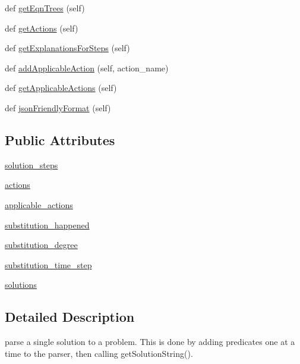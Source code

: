\begin{DoxyCompactItemize}
\item 
def \hyperlink{classeqn__viz_1_1_math_problem_parser_a105702b6ef3f51d49153c51b1a5b1a29}{get\+Eqn\+Trees} (self)
\item 
def \hyperlink{classeqn__viz_1_1_math_problem_parser_aabf2f43b2ee403d9cf0cb873bbe28db9}{get\+Actions} (self)
\item 
def \hyperlink{classeqn__viz_1_1_math_problem_parser_a247aa12b6f38592c0fbcd0ac15b5520d}{get\+Explanations\+For\+Steps} (self)
\item 
def \hyperlink{classeqn__viz_1_1_math_problem_parser_af346d451472b46a9228c07d3dd7f0de8}{add\+Applicable\+Action} (self, action\+\_\+name)
\item 
def \hyperlink{classeqn__viz_1_1_math_problem_parser_aa8aded82942f9ac196e6e109fb9a45ec}{get\+Applicable\+Actions} (self)
\item 
def \hyperlink{classeqn__viz_1_1_math_problem_parser_a6adfec45bb22a5585db6e689c27aa393}{json\+Friendly\+Format} (self)
\end{DoxyCompactItemize}
\subsection*{Public Attributes}
\begin{DoxyCompactItemize}
\item 
\hyperlink{classeqn__viz_1_1_math_problem_parser_aa35a182df8bfc89e74a840e370e089f2}{solution\+\_\+steps}
\item 
\hyperlink{classeqn__viz_1_1_math_problem_parser_a3b02b0edd100ee6fd0b5b7d66bb22ecb}{actions}
\item 
\hyperlink{classeqn__viz_1_1_math_problem_parser_a09056a3b2b2490dccc4d3527c75c8f69}{applicable\+\_\+actions}
\item 
\hyperlink{classeqn__viz_1_1_math_problem_parser_a90141c1857b83a1bdfa5951453217204}{substitution\+\_\+happened}
\item 
\hyperlink{classeqn__viz_1_1_math_problem_parser_adda230f26ba7a90aa56f72e58a748c9e}{substitution\+\_\+degree}
\item 
\hyperlink{classeqn__viz_1_1_math_problem_parser_a6761399d080e0fd649cd5c2582590ccd}{substitution\+\_\+time\+\_\+step}
\item 
\hyperlink{classeqn__viz_1_1_math_problem_parser_ab84ba1169767799be1491b2baecb10ed}{solutions}
\end{DoxyCompactItemize}


\subsection{Detailed Description}
\begin{DoxyVerb}parse a single solution to a problem. This is done by adding
predicates one at a time to the parser, then calling 
getSolutionString().
\end{DoxyVerb}
 

